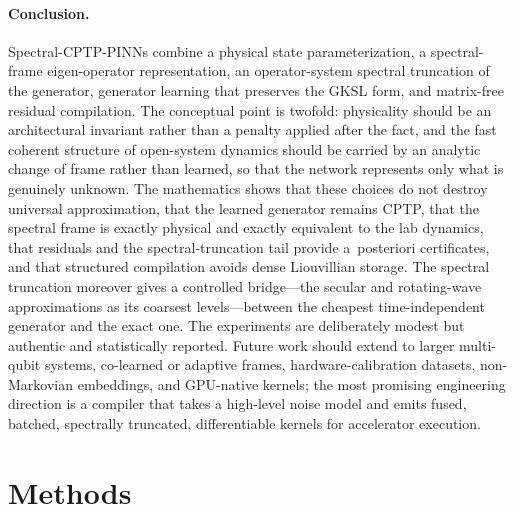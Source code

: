 \documentclass[11pt]{article}
\begin{document}
\paragraph{Conclusion.}
Spectral-CPTP-PINNs combine a physical state parameterization, a spectral-frame eigen-operator representation, an operator-system spectral truncation of the generator, generator learning that preserves the GKSL form, and matrix-free residual compilation. The conceptual point is twofold: physicality should be an architectural invariant rather than a penalty applied after the fact, and the fast coherent structure of open-system dynamics should be carried by an analytic change of frame rather than learned, so that the network represents only what is genuinely unknown. The mathematics shows that these choices do not destroy universal approximation, that the learned generator remains CPTP, that the spectral frame is exactly physical and exactly equivalent to the lab dynamics, that residuals and the spectral-truncation tail provide a~posteriori certificates, and that structured compilation avoids dense Liouvillian storage. The spectral truncation moreover gives a controlled bridge---the secular and rotating-wave approximations as its coarsest levels---between the cheapest time-independent generator and the exact one. The experiments are deliberately modest but authentic and statistically reported. Future work should extend to larger multi-qubit systems, co-learned or adaptive frames, hardware-calibration datasets, non-Markovian embeddings, and GPU-native kernels; the most promising engineering direction is a compiler that takes a high-level noise model and emits fused, batched, spectrally truncated, differentiable kernels for accelerator execution.

\section{Methods}
\label{sec:methods}
\end{document}
